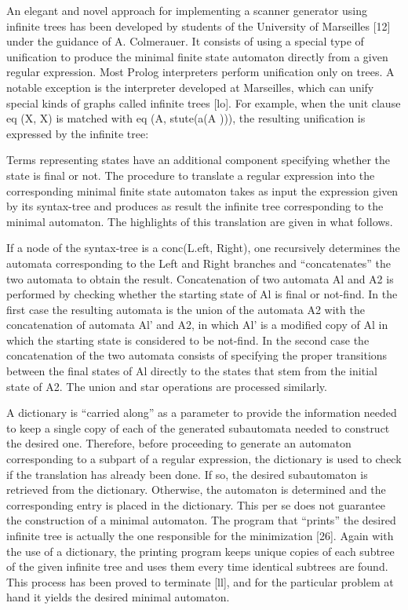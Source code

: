 An elegant and novel approach for implementing a scanner generator using
infinite trees has been developed by students of the University of Marseilles [12]
under the guidance of A. Colmerauer. It consists of using a special type of
unification to produce the minimal finite state automaton directly from a given
regular expression. Most Prolog interpreters perform unification only on trees.
A notable exception is the interpreter developed at Marseilles, which can unify
special kinds of graphs called infinite trees [lo]. For example, when the unit
clause eq (X, X) is matched with eq (A, stute(a(A ))), the resulting unification is
expressed by the infinite tree: 


Terms representing states have an additional component specifying whether
the state is final or not. The procedure to translate a regular expression into the
corresponding minimal finite state automaton takes as input the expression given
by its syntax-tree and produces as result the infinite tree corresponding to the
minimal automaton. The highlights of this translation are given in what follows. 

If a node of the syntax-tree is a conc(L.eft, Right), one recursively determines
the automata corresponding to the Left and Right branches and “concatenates”
the two automata to obtain the result. Concatenation of two automata Al and
A2 is performed by checking whether the starting state of Al is final or not-find.
In the first case the resulting automata is the union of the automata A2 with the
concatenation of automata Al’ and A2, in which Al’ is a modified copy of Al in
which the starting state is considered to be not-find. In the second case the
concatenation of the two automata consists of specifying the proper transitions
between the final states of Al directly to the states that stem from the initial
state of A2. The union and star operations are processed similarly. 

A dictionary is “carried along” as a parameter to provide the information
needed to keep a single copy of each of the generated subautomata needed to
construct the desired one. Therefore, before proceeding to generate an automaton
corresponding to a subpart of a regular expression, the dictionary is used to check
if the translation has already been done. If so, the desired subautomaton is
retrieved from the dictionary. Otherwise, the automaton is determined and the
corresponding entry is placed in the dictionary. This per se does not guarantee
the construction of a minimal automaton. The program that “prints” the desired
infinite tree is actually the one responsible for the minimization [26]. Again with
the use of a dictionary, the printing program keeps unique copies of each subtree
of the given infinite tree and uses them every time identical subtrees are found.
This process has been proved to terminate [ll], and for the particular problem
at hand it yields the desired minimal automaton. 

